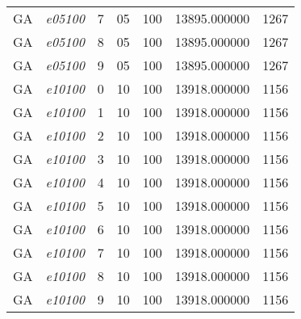 {\begin{longtable}{cc|c|cc|cc}
			GA                 & \textit{e05100}    & 7                               & 05               & 100              & 13895.000000                          & 1267 \\ 
			GA                 & \textit{e05100}    & 8                               & 05               & 100              & 13895.000000                          & 1267 \\ 
			GA                 & \textit{e05100}    & 9                               & 05               & 100              & 13895.000000                          & 1267 \\ \hline
			GA                 & \textit{e10100}    & 0                               & 10               & 100              & 13918.000000                          & 1156 \\ 
			GA                 & \textit{e10100}    & 1                               & 10               & 100              & 13918.000000                          & 1156 \\ 
			GA                 & \textit{e10100}    & 2                               & 10               & 100              & 13918.000000                          & 1156 \\ 
			GA                 & \textit{e10100}    & 3                               & 10               & 100              & 13918.000000                          & 1156 \\ 
			GA                 & \textit{e10100}    & 4                               & 10               & 100              & 13918.000000                          & 1156 \\ 
			GA                 & \textit{e10100}    & 5                               & 10               & 100              & 13918.000000                          & 1156 \\ 
			GA                 & \textit{e10100}    & 6                               & 10               & 100              & 13918.000000                          & 1156 \\ 
			GA                 & \textit{e10100}    & 7                               & 10               & 100              & 13918.000000                          & 1156 \\ 
			GA                 & \textit{e10100}    & 8                               & 10               & 100              & 13918.000000                          & 1156 \\ 
			GA                 & \textit{e10100}    & 9                               & 10               & 100              & 13918.000000                          & 1156 \\ \hline

\end{longtable}}
